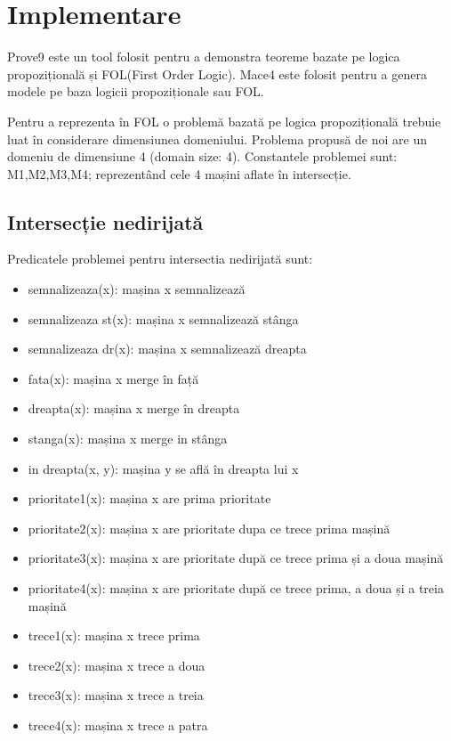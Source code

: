  \section{Implementare}

Prove9 este un tool folosit pentru a demonstra teoreme bazate pe logica propozițională și FOL(First Order Logic). Mace4 este folosit pentru a genera modele pe baza logicii propoziționale sau FOL.

Pentru a reprezenta în FOL o problemă bazată pe logica propozițională trebuie luat în considerare dimensiunea domeniului. Problema propusă de noi are un domeniu de dimensiune 4 (domain size: 4).
\newline
Constantele problemei sunt: M1,M2,M3,M4; reprezentând cele 4 mașini aflate în intersecție.
\newline
\subsection{Intersecție nedirijată}
Predicatele problemei pentru intersectia nedirijată  sunt:

 \begin{itemize}
    \setlength\itemsep{0em}
    \item semnalizeaza(x): mașina x semnalizează
    \item semnalizeaza st(x): mașina x semnalizează stânga
    \item semnalizeaza dr(x): mașina x semnalizează dreapta
    \item fata(x): mașina x merge în față
    \item dreapta(x): mașina x merge în dreapta
    \item stanga(x): mașina x merge in stânga
    \item in dreapta(x, y): mașina y se află în dreapta lui x
    \item prioritate1(x): mașina x are prima prioritate
    \item prioritate2(x): mașina x are prioritate dupa ce trece prima mașină
    \item prioritate3(x): mașina x are prioritate după ce trece prima și a doua mașină
    \item prioritate4(x): mașina x are prioritate după ce trece prima, a doua și a treia mașină
    \item  trece1(x): mașina x trece prima 
    \item  trece2(x): mașina x trece a doua
    \item trece3(x): mașina x trece a treia
    \item  trece4(x): mașina x trece a patra


\end{itemize}

